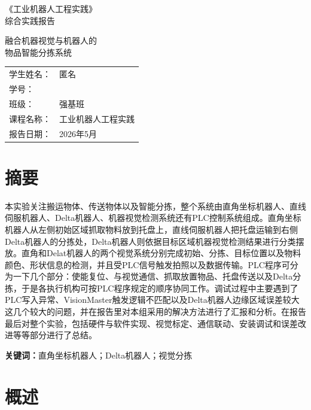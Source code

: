 \documentclass[UTF8,a4paper,12pt,fontset=windows]{ctexart}
\begin{document}
\begin{titlepage}
  \centering
  \vspace*{1.2cm}
  {\heiti 《工业机器人工程实践》\\[0.5cm]综合实践报告\par}
  \vspace{1.8cm}
  {\heiti 融合机器视觉与机器人的\\[0.35cm]物品智能分拣系统\par}
  \vfill
  \begin{tabular}{>{\heiti}p{4cm}p{7cm}}
    学生姓名： & 匿名\\[0.35cm]
    学号： & \\[0.35cm]
    班级： & 强基班\\[0.35cm]
    课程名称： & 工业机器人工程实践\\[0.35cm]
    报告日期： & 2026年5月\\
  \end{tabular}
  \vfill
\end{titlepage}

\section*{摘\quad 要}
本实验关注搬运物体、传送物体以及智能分拣，整个系统由直角坐标机器人、直线伺服机器人、Delta机器人、机器视觉检测系统还有PLC控制系统组成。直角坐标机器人从左侧初始区域抓取物料放到托盘上，直线伺服机器人把托盘运输到右侧Delta机器人的分拣处，Delta机器人则依据目标区域机器视觉检测结果进行分类摆放。直角和Delat机器人的两个视觉系统分别完成初始、分拣、目标位置以及物料颜色、形状信息的检测，并且受PLC信号触发拍照以及数据传输。PLC程序可分为一下几个部分：使能复位、与视觉通信、抓取放置物品、托盘传送以及Delta分拣，于是各执行机构可按PLC程序规定的顺序协同工作。调试过程中主要遇到了PLC写入异常、VisionMaster触发逻辑不匹配以及Delta机器人边缘区域误差较大这几个较大的问题，并在报告里对本组采用的解决方法进行了汇报和分析。在报告最后对整个实验，包括硬件与软件实现、视觉标定、通信联动、安装调试和误差改进等等部分进行了总结。

\noindent\textbf{关键词：}直角坐标机器人；Delta机器人；视觉分拣

\clearpage
\tableofcontents
\clearpage
{}

\section{概述}
\end{document}
